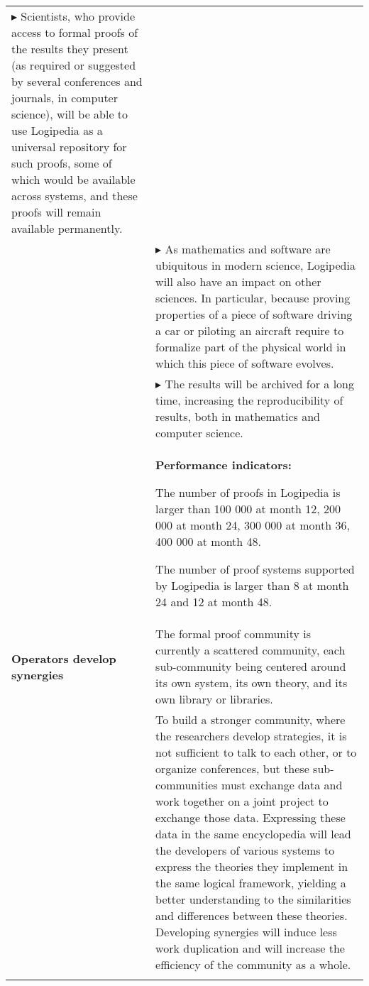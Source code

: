 \begin{longtable}{|p{}|p{}|}
$\blacktriangleright$ Scientists, who provide access
  to formal proofs of the results they present (as required or
  suggested by several conferences and journals, in computer science), 
  will be able to
  use Logipedia as a universal repository for such proofs, some of
  which would be available across systems, and these proofs will remain
  available permanently.
\\
&
$\blacktriangleright$ As mathematics and software are ubiquitous in 
  modern science, Logipedia will also have an impact on other sciences. 
  In particular, because proving properties of a piece of software driving 
  a car or piloting an aircraft require to formalize part of the physical 
  world in which this piece of software evolves.
\\
& 
$\blacktriangleright$ The results will be archived for a long time, increasing the
  reproducibility of results, both in mathematics and computer science.
\\
&
\colorbox{color2}{\bf Performance indicators:}
\begin{compactitem}
\item The number of proofs in Logipedia is larger than 100 000 at month 12,
  200 000 at month 24, 300 000 at month 36, 400 000 at month 48.
\item The number of proof systems supported by Logipedia is larger than 8 at
  month 24 and 12 at month 48.
\end{compactitem}
\\
\hline
{\bf Operators develop synergies}
&
The formal proof community is currently a scattered community, each
sub-community being centered around its own system, its own theory,
and its own library or libraries.\\
&
\hspace{0.4cm}
To build a stronger community, where the researchers develop
strategies, it is not sufficient to talk to each other, or to organize
conferences, but these sub-communities must exchange data and work
together on a joint project to exchange those data.  Expressing these
data in the same encyclopedia will lead the developers of various
systems to express the theories they implement in the same logical
framework, yielding a better understanding to the similarities and
differences between these theories.  Developing synergies will induce
less work duplication and will increase the efficiency of the
community as a whole.
\\
&
\hspace{0.4cm}

\end{longtable}
